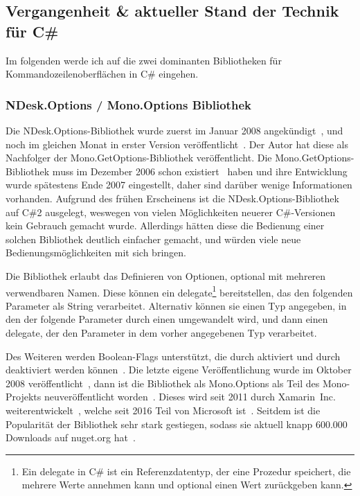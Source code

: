 \subsection{Vergangenheit \& aktueller Stand der Technik für C\#}\label{subsec:CurrentState}
Im folgenden werde ich auf die zwei dominanten Bibliotheken für Kommandozeilenoberflächen in C\# eingehen.
\subsubsection{NDesk.Options / Mono.Options Bibliothek}
Die NDesk.Options-Bibliothek wurde zuerst im Januar 2008 angekündigt~\cite{NDeskAnnouncement},
und noch im gleichen Monat in erster Version veröffentlicht~\cite{NDesk1stRelease}.
Der Autor hat diese als Nachfolger der Mono.GetOptions-Bibliothek veröffentlicht.
Die Mono.GetOptions-Bibliothek muss im Dezember 2006 schon existiert~\cite{MonoGetOptions3rdBlogPost} haben und ihre Entwicklung wurde spätestens Ende 2007 eingestellt,
daher sind darüber wenige Informationen vorhanden.
Aufgrund des frühen Erscheinens ist die NDesk.Options-Bibliothek auf C\#2 ausgelegt, weswegen von vielen Möglichkeiten neuerer C\#-Versionen kein Gebrauch gemacht wurde.
Allerdings hätten diese die Bedienung einer solchen Bibliothek deutlich einfacher gemacht, und würden viele neue Bedienungsmöglichkeiten mit sich bringen.

Die Bibliothek erlaubt das Definieren von Optionen, optional mit mehreren verwendbaren Namen.
Diese können ein delegate\footnote{Ein delegate in C\# ist ein Referenzdatentyp, der eine Prozedur speichert, die mehrere Werte annehmen kann und optional einen Wert zurückgeben kann.} bereitstellen, das den folgenden Parameter als String verarbeitet.
Alternativ können sie einen Typ angegeben, in den der folgende Parameter durch einen  umgewandelt wird,
und dann einen delegate, der den Parameter in dem vorher angegebenen Typ verarbeitet.

Des Weiteren werden Boolean-Flags unterstützt, die durch  aktiviert
und durch  deaktiviert werden können~\cite{NDeskOptionSetDocumentation}.
Die letzte eigene Veröffentlichung wurde im Oktober 2008 veröffentlicht~\cite{NDeskOptionsLastRelease},
dann ist die Bibliothek als Mono.Options als Teil des Mono-Projekts neuveröffentlicht worden~\cite{MonoOptions1stCommit}.
Dieses wird seit 2011 durch Xamarin~Inc. weiterentwickelt~\cite{MonoFutureInterview}, welche seit 2016 Teil von Microsoft ist~\cite{MicrosoftBlogAcquireXamarin}.
Seitdem ist die Popularität der Bibliothek sehr stark gestiegen, sodass sie aktuell knapp 600.000 Downloads auf nuget.org hat~\cite{MonoOptionsNuget}.
